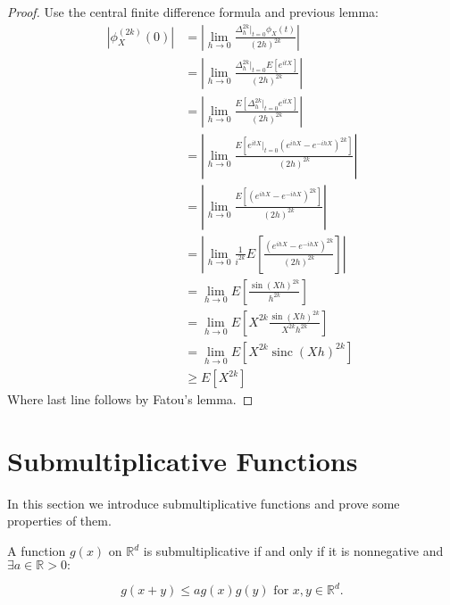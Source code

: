 \documentclass[a4paper,11pt]{article}
\begin{document}
\begin{proof}
    Use the central finite difference formula and previous lemma:
    \begin{align}
        |\phi_{X}^{(2k)}(0)| & = \left|\lim_{h \to 0} \frac{\Delta^{2k}_{h}|_{t=0} \phi_{X}(t)}{(2h)^{2k}}\right|                      \\
                             & = \left|\lim_{h \to 0} \frac{\Delta^{2k}_{h}|_{t=0} E\left[e^{itX}\right]}{(2h)^{2k}}\right|            \\
                             & = \left|\lim_{h \to 0} \frac{ E\left[\Delta^{2k}_{h}|_{t=0}e^{itX}\right]}{(2h)^{2k}}\right|            \\
                             & = \left|\lim_{h \to 0} \frac{ E\left[e^{itX} |_{t=0} (e^{ihX}-e^{-ihX})^{2k}\right]}{(2h)^{2k}}\right|  \\
                             & = \left|\lim_{h \to 0} \frac{ E\left[(e^{ihX}-e^{-ihX})^{2k}\right]}{(2h)^{2k}}\right|                  \\
                             & = \left|\lim_{h \to 0} \frac{1}{i^{2k}}E\left[\frac{ (e^{ihX}-e^{-ihX})^{2k}}{(2h)^{2k}} \right]\right| \\
                             & = \lim_{h \to 0} E\left[\frac{ \sin(Xh)^{2k}}{h^{2k}}\right]                                            \\
                             & = \lim_{h \to 0} E\left[ X^{2k}\frac{ \sin(Xh)^{2k}}{X^{2k} h^{2k}}\right]                              \\
                             & = \lim_{h \to 0} E\left[ X^{2k} \operatorname{sinc}(Xh) ^{2k}\right]                                    \\
                             & \ge  E\left[ X^{2k} \right]
    \end{align}
    Where last line follows by Fatou's lemma.
\end{proof}

\section{Submultiplicative Functions}
In this section we introduce submultiplicative functions and prove some properties of them.

\begin{definition}
    A function $g(x)$ on $\mathbb{R}^{d}$ is submultiplicative if and only if it is nonnegative
    and $\exists a \in \mathbb{R}>0:$

    \begin{equation}
        g(x+y) \leq a g(x) g(y) \text { for } x, y \in \mathbb{R}^{d}
        .
    \end{equation}

\end{definition}
\end{document}
